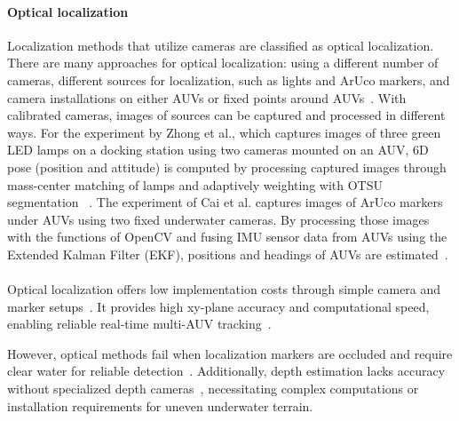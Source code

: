 \documentclass[11pt]{article}
\begin{document}
        \paragraph{Optical localization}
        Localization methods that utilize cameras are classified as optical localization. There are many approaches for optical localization: using a different number of cameras, different sources for localization, such as lights and ArUco markers, and camera installations on either AUVs or fixed points around AUVs~\cite{cai_development_2024,zhong_fast_2019}. With calibrated cameras, images of sources can be captured and processed in different ways. For the experiment by Zhong et al., which captures images of three green LED lamps on a docking station using two cameras mounted on an AUV, 6D pose (position and attitude) is computed by processing captured images through mass-center matching of lamps and adaptively weighting with OTSU segmentation ~\cite{zhong_fast_2019}. The experiment of Cai et al. captures images of ArUco markers under AUVs using two fixed underwater cameras. By processing those images with the functions of OpenCV and fusing IMU sensor data from AUVs using the Extended Kalman Filter (EKF), positions and headings of AUVs are estimated~\cite{cai_development_2024}.\\\\
        Optical localization offers low implementation costs through simple camera and marker setups~\cite{cai_development_2024, zhong_fast_2019}. It provides high xy-plane accuracy and computational speed, enabling reliable real-time multi-AUV tracking~\cite{zhong_fast_2019}.

        However, optical methods fail when localization markers are occluded and require clear water for reliable detection~\cite{cai_development_2024,zhong_fast_2019}. Additionally, depth estimation lacks accuracy without specialized depth cameras~\cite{cai_development_2024}, necessitating complex computations or installation requirements for uneven underwater terrain.
\end{document}
